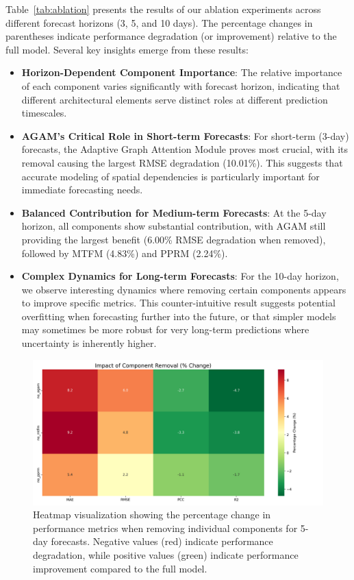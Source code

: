 \documentclass[lettersize, journal]{IEEEtran}
\begin{document}
Table~\ref{tab:ablation} presents the results of our ablation experiments across different forecast horizons (3, 5, and 10 days). The percentage changes in parentheses indicate performance degradation (or improvement) relative to the full model. Several key insights emerge from these results:

\begin{itemize}
    \item \textbf{Horizon-Dependent Component Importance}: The relative importance of each component varies significantly with forecast horizon, indicating that different architectural elements serve distinct roles at different prediction timescales.
    
    \item \textbf{AGAM's Critical Role in Short-term Forecasts}: For short-term (3-day) forecasts, the Adaptive Graph Attention Module proves most crucial, with its removal causing the largest RMSE degradation (10.01\%). This suggests that accurate modeling of spatial dependencies is particularly important for immediate forecasting needs.
    
    \item \textbf{Balanced Contribution for Medium-term Forecasts}: At the 5-day horizon, all components show substantial contribution, with AGAM still providing the largest benefit (6.00\% RMSE degradation when removed), followed by MTFM (4.83\%) and PPRM (2.24\%).
    
    \item \textbf{Complex Dynamics for Long-term Forecasts}: For the 10-day horizon, we observe interesting dynamics where removing certain components appears to improve specific metrics. This counter-intuitive result suggests potential overfitting when forecasting further into the future, or that simpler models may sometimes be more robust for very long-term predictions where uncertainty is inherently higher.
\end{itemize}

\begin{figure}[htbp]
    \centering
    \includegraphics[width=\columnwidth]{../../figures/ablation_heatmap_japan.w-20.h-5.png}
    \caption{Heatmap visualization showing the percentage change in performance metrics when removing individual components for 5-day forecasts. Negative values (red) indicate performance degradation, while positive values (green) indicate performance improvement compared to the full model.}
    \label{fig:ablation_impact}
\end{figure}
\end{document}
